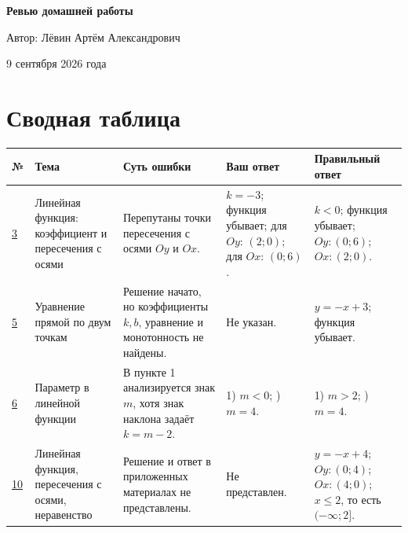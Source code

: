 \documentclass[12pt,a4paper]{article}
\begin{document}
\begin{titlepage}
\thispagestyle{empty}
\begin{center}
\vspace*{0.24\textheight}

{\LARGE\bfseries Ревью домашней работы\par}

\vspace{18mm}

{\large Автор: Лёвин Артём Александрович\par}

\vspace{7mm}

{\large 9 сентября 2026 года\par}

\vfill


\vspace{7mm}
\end{center}
\end{titlepage}

\newpage
\section*{Сводная таблица}
\small
\begin{center}
\begin{tabular}{@{}p{9mm}p{30mm}p{45mm}p{34mm}p{34mm}@{}}
\toprule
\textbf{№} &
\textbf{Тема} &
\textbf{Суть ошибки} &
\textbf{Ваш ответ} &
\textbf{Правильный ответ} \\
\midrule
\hyperref[task:3]{3} &
Линейная функция: коэффициент и пересечения с осями &
Перепутаны точки пересечения с осями \(Oy\) и \(Ox\). &
\(k=-3\); функция убывает; для \(Oy\): \((2;0)\); для \(Ox\): \((0;6)\). &
\(k<0\); функция убывает; \(Oy:(0;6)\); \(Ox:(2;0)\). \\
\addlinespace
\hyperref[task:5]{5} &
Уравнение прямой по двум точкам &
Решение начато, но коэффициенты \(k,b\), уравнение и монотонность не найдены. &
Не указан. &
\(y=-x+3\); функция убывает. \\
\addlinespace
\hyperref[task:6]{6} &
Параметр в линейной функции &
В пункте 1 анализируется знак \(m\), хотя знак наклона задаёт \(k=m-2\). &
1) \(m<0\); \quad 2) \(m=4\). &
1) \(m>2\); \quad 2) \(m=4\). \\
\addlinespace
\hyperref[task:10]{10} &
Линейная функция, пересечения с осями, неравенство &
Решение и ответ в приложенных материалах не представлены. &
Не представлен. &
\(y=-x+4\); \(Oy:(0;4)\); \(Ox:(4;0)\); \(x\le 2\), то есть \((-\infty;2]\). \\
\bottomrule
\end{tabular}
\end{center}
\normalsize
\end{document}
